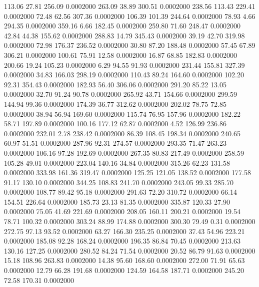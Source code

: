  113.06   27.81  256.09   0.0002000
 263.09   38.89  300.51   0.0002000
 238.56  113.43  229.41   0.0002000
  72.48   62.56  307.36   0.0002000
 106.39  101.39  244.64   0.0002000
  78.93    4.66  294.35   0.0002000
 359.16    6.66  182.45   0.0002000
 259.80   71.60  248.47   0.0002000
  42.84   44.38  155.62   0.0002000
 288.83   14.79  345.43   0.0002000
  39.19   42.70  319.98   0.0002000
  72.98  176.37  236.52   0.0002000
  30.80   87.20  188.48   0.0002000
  57.45   67.89  306.21   0.0002000
 100.61   75.91   12.58   0.0002000
  16.87   68.85  182.83   0.0002000
 200.66   19.24  105.23   0.0002000
   6.29   94.55   91.93   0.0002000
 231.44  155.81  327.39   0.0002000
  34.83  166.03  298.19   0.0002000
 110.43   89.24  164.60   0.0002000
 102.20   92.31  354.43   0.0002000
 182.93   56.40  306.06   0.0002000
 291.20   85.22   13.05   0.0002000
  32.70   91.24   90.78   0.0002000
 265.92   43.71  154.66   0.0002000
 299.59  144.94   99.36   0.0002000
 174.39   36.77  312.62   0.0002000
 202.02   78.75   72.85   0.0002000
  38.94   56.94  169.60   0.0002000
 115.74   76.95  157.96   0.0002000
 182.22   58.71  197.89   0.0002000
 100.16  177.12   62.87   0.0002000
   4.52  126.99  236.86   0.0002000
 232.01    2.78  238.42   0.0002000
  86.39  108.45  198.34   0.0002000
 240.65   60.97   51.51   0.0002000
 287.96   92.31  274.57   0.0002000
 293.35   71.47  263.23   0.0002000
 106.16   97.28  192.69   0.0002000
 267.35   80.83  217.49   0.0002000
 258.59  105.28   49.01   0.0002000
 223.04  140.16   34.84   0.0002000
 315.26   62.23  131.58   0.0002000
 333.98  161.36  319.47   0.0002000
 125.25  121.05  138.52   0.0002000
 177.58   91.17  130.10   0.0002000
 344.25  108.83  241.70   0.0002000
 243.05   99.33  285.70   0.0002000
 108.77   89.42   95.18   0.0002000
 291.63   72.20  310.72   0.0002000
  66.14  154.51  226.64   0.0002000
 185.73   23.13   81.35   0.0002000
 335.87  120.33   27.90   0.0002000
  75.05   41.69  221.69   0.0002000
 208.05  160.11  200.21   0.0002000
  19.54   78.71  100.32   0.0002000
 303.24   88.99  174.88   0.0002000
 300.30   79.49    0.31   0.0002000
 272.75   97.13   93.52   0.0002000
  63.27  166.30  235.25   0.0002000
  37.43   54.96  223.21   0.0002000
 185.08   92.28  168.24   0.0002000
 196.35   86.84   70.45   0.0002000
 213.63  130.16  127.25   0.0002000
 280.52   84.24   71.54   0.0002000
  20.52   86.79   91.63   0.0002000
  15.18  108.96  263.83   0.0002000
  14.38   95.60  168.60   0.0002000
 272.00   71.91   65.63   0.0002000
  12.79   66.28  191.68   0.0002000
 124.59  164.58  187.71   0.0002000
 245.20   72.58  170.31   0.0002000

